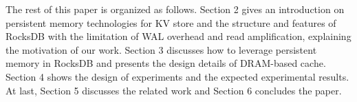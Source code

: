 The rest of this paper is organized as follows. Section 2 gives an introduction on persistent memory technologies for KV store and the structure and features of RocksDB with the limitation of WAL overhead and read amplification, explaining the motivation of our work. Section 3 discusses how to leverage persistent memory in RocksDB and presents the design details of DRAM-based cache. Section 4 shows the design of experiments and the expected experimental results. At last, Section 5 discusses the related work and Section 6 concludes the paper.